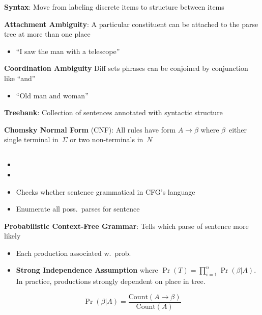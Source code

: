 \documentclass[9pt]{extarticle}
\renewcommand{\green}[1]{{\color{ForestGreen} #1}}
\newcommand{\greenbf}[1]{\textbf{\green{#1}}}
\begin{document}
\begin{multicols}{3}
  \textbf{Syntax}: Move from labeling discrete items to structure between items

  \greenbf{Attachment Ambiguity}: A particular constituent can be attached to the parse tree at more than one place
  \begin{itemize}
    \item ``I saw the man with a telescope''
  \end{itemize}

  \greenbf{Coordination Ambiguity} Diff sets phrases can be conjoined by conjunction like ``and''
  \begin{itemize}
    \item ``Old man and woman''
  \end{itemize}

  \greenbf{Treebank}: Collection of sentences annotated with syntactic structure

  \greenbf{Chomsky Normal Form} (CNF): All rules have form ${A \rightarrow \beta}$ where $\beta$~either single terminal in~$\Sigma$ or two non-terminals in~$N$

  \subsection*{}

  \begin{itemize}
    \item {}
    \item \red{Every time has below it a range ${[start,end)}$}
    \item Checks whether sentence grammatical in CFG's language
    \item Enumerate all poss.\ parses for sentence
  \end{itemize}

  \greenbf{Probabilistic Context-Free Grammar}: Tells which parse of sentence more likely
  \begin{itemize}
    \item Each production associated w.\ prob.
    \item \textbf{Strong Independence Assumption} where ${\Pr(T) = \prod_{i=1}^{n} \Pr(\beta \vert A)}$. In practice, productions strongly dependent on place in tree.
  \end{itemize}

  \begin{equation*}
    \Pr(\beta \vert A) = \frac{\text{Count}(A \rightarrow \beta)}{\text{Count}(A)}
  \end{equation*}


\end{multicols}
\end{document}
